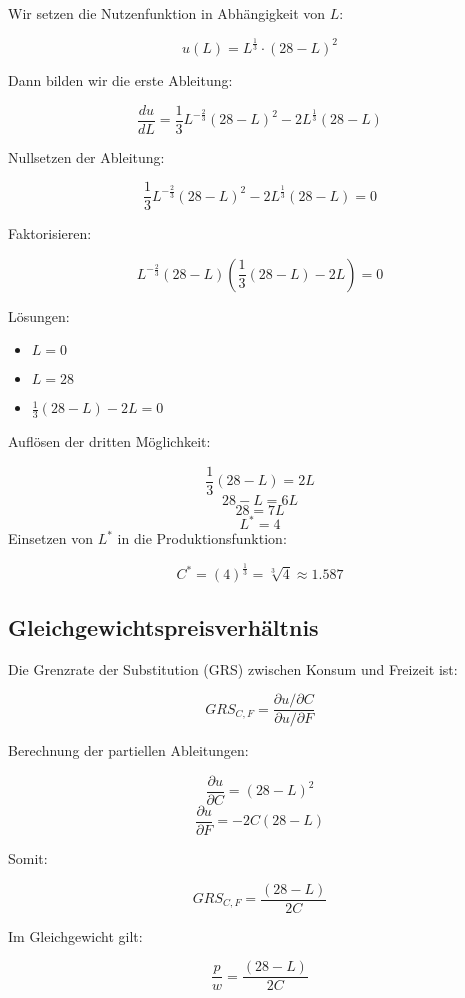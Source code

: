 \begin{solution}
	Wir setzen die Nutzenfunktion in Abhängigkeit von \( L \):

	\[
		u(L) = L^{\frac{1}{3}} \cdot (28 - L)^2
	\]

	Dann bilden wir die erste Ableitung:

	\[
		\frac{d u}{d L} = \frac{1}{3} L^{-\frac{2}{3}} (28 - L)^2 - 2 L^{\frac{1}{3}} (28 - L)
	\]

	Nullsetzen der Ableitung:

	\[
		\frac{1}{3} L^{-\frac{2}{3}} (28 - L)^2 - 2 L^{\frac{1}{3}} (28 - L) = 0
	\]

	Faktorisieren:

	\[
		L^{-\frac{2}{3}} (28 - L) \left( \frac{1}{3}(28 - L) - 2 L \right) = 0
	\]

	Lösungen:

	\begin{itemize}
		\item \( L = 0 \)
		\item \( L = 28 \)
		\item \(\frac{1}{3}(28 - L) - 2L = 0 \)
	\end{itemize}

	Auflösen der dritten Möglichkeit:

	\[
		\frac{1}{3}(28 - L) = 2L
	\]
	\[
		28 - L = 6L
	\]
	\[
		28 = 7L
	\]
	\[
		L^* = 4
	\]
	Einsetzen von \( L^* \) in die Produktionsfunktion:

	\[
		C^* = (4)^{\frac{1}{3}} = \sqrt[3]{4} \approx 1.587
	\]

	\subsection*{Gleichgewichtspreisverhältnis}

	Die Grenzrate der Substitution (GRS) zwischen Konsum und Freizeit ist:

	\[
		GRS_{C,F} = \frac{\partial u / \partial C}{\partial u / \partial F}
	\]

	Berechnung der partiellen Ableitungen:

	\[
		\frac{\partial u}{\partial C} = (28 - L)^2
	\]
	\[
		\frac{\partial u}{\partial F} = -2C (28 - L)
	\]

	Somit:

	\[
		GRS_{C,F} = \frac{(28 - L)}{2C}
	\]

	Im Gleichgewicht gilt:

	\[
		\frac{p}{w} = \frac{(28 - L)}{2C}
	\]


\end{solution}
